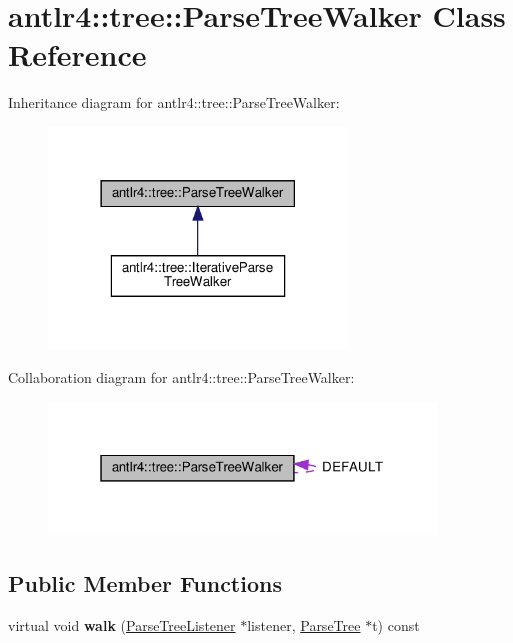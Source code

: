 \hypertarget{classantlr4_1_1tree_1_1ParseTreeWalker}{}\section{antlr4\+:\+:tree\+:\+:Parse\+Tree\+Walker Class Reference}
\label{classantlr4_1_1tree_1_1ParseTreeWalker}


Inheritance diagram for antlr4\+:\+:tree\+:\+:Parse\+Tree\+Walker\+:
\nopagebreak
\begin{figure}[H]
\begin{center}
\leavevmode
\includegraphics[width=225pt]{classantlr4_1_1tree_1_1ParseTreeWalker__inherit__graph}
\end{center}
\end{figure}


Collaboration diagram for antlr4\+:\+:tree\+:\+:Parse\+Tree\+Walker\+:
\nopagebreak
\begin{figure}[H]
\begin{center}
\leavevmode
\includegraphics[width=292pt]{classantlr4_1_1tree_1_1ParseTreeWalker__coll__graph}
\end{center}
\end{figure}
\subsection*{Public Member Functions}
\begin{DoxyCompactItemize}
\item 
\mbox{\label{classantlr4_1_1tree_1_1ParseTreeWalker_a6b5fdb6419bf62860a87dfde5c9815fb}} 
virtual void {\bfseries walk} (\hyperlink{classantlr4_1_1tree_1_1ParseTreeListener}{Parse\+Tree\+Listener} $\ast$listener, \hyperlink{classantlr4_1_1tree_1_1ParseTree}{Parse\+Tree} $\ast$t) const
\end{DoxyCompactItemize}
